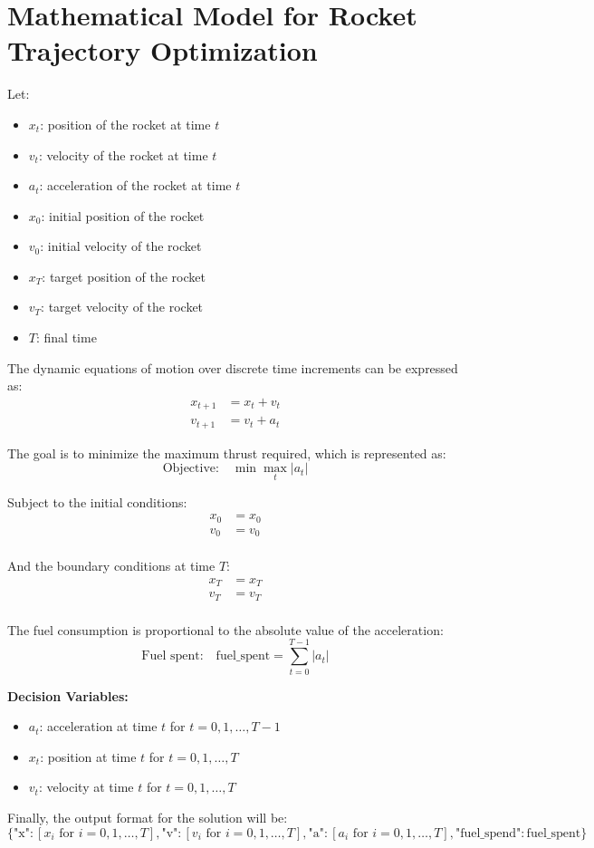 \documentclass{article}
\begin{document}
\section*{Mathematical Model for Rocket Trajectory Optimization}

Let:
\begin{itemize}
    \item \( x_t \): position of the rocket at time \( t \)
    \item \( v_t \): velocity of the rocket at time \( t \)
    \item \( a_t \): acceleration of the rocket at time \( t \)
    \item \( x_0 \): initial position of the rocket
    \item \( v_0 \): initial velocity of the rocket
    \item \( x_T \): target position of the rocket
    \item \( v_T \): target velocity of the rocket
    \item \( T \): final time
\end{itemize}

The dynamic equations of motion over discrete time increments can be expressed as:
\[
\begin{align*}
x_{t+1} & = x_t + v_t \\
v_{t+1} & = v_t + a_t
\end{align*}
\]

The goal is to minimize the maximum thrust required, which is represented as:
\[
\text{Objective:} \quad \min \max_{t} |a_t|
\]

Subject to the initial conditions:
\[
\begin{align*}
x_0 & = x_0 \\
v_0 & = v_0 \\
\end{align*}
\]

And the boundary conditions at time \( T \):
\[
\begin{align*}
x_T & = x_T \\
v_T & = v_T \\
\end{align*}
\]

The fuel consumption is proportional to the absolute value of the acceleration:
\[
\text{Fuel spent:} \quad \text{fuel\_spent} = \sum_{t=0}^{T-1} |a_t|
\]

\textbf{Decision Variables:}
\begin{itemize}
    \item \( a_t \): acceleration at time \( t \) for \( t = 0, 1, \ldots, T-1 \)
    \item \( x_t \): position at time \( t \) for \( t = 0, 1, \ldots, T \)
    \item \( v_t \): velocity at time \( t \) for \( t = 0, 1, \ldots, T \)
\end{itemize}

Finally, the output format for the solution will be:
\[
\{
    \text{"x"}: [x_i \text{ for } i = 0, 1, \ldots, T],
    \text{"v"}: [v_i \text{ for } i = 0, 1, \ldots, T],
    \text{"a"}: [a_i \text{ for } i = 0, 1, \ldots, T],
    \text{"fuel\_spend"}: \text{fuel\_spent}
\}
\]
\end{document}
